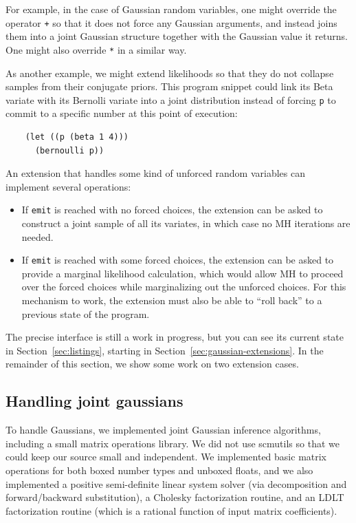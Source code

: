 \documentclass{article}
\begin{document}
For example, in the case of Gaussian random variables, one might override the
operator \texttt{+} so that it does not force any Gaussian arguments, and
instead joins them into a joint Gaussian structure together with the Gaussian
value it returns. One might also override \texttt{*} in a similar way.

As another example, we might extend likelihoods so that they do not collapse
samples from their conjugate priors. This program snippet could link its Beta variate
with its Bernolli variate into a joint distribution instead of forcing
\texttt{p} to commit to a specific number at this point of execution:

\begin{verbatim}
    (let ((p (beta 1 4)))
      (bernoulli p))
\end{verbatim}

An extension that handles some kind of unforced random variables can implement
several operations:
\begin{itemize}
    \item If \texttt{emit} is reached with no forced choices, the extension can
        be asked to construct a joint sample of all its variates, in which case
        no MH iterations are needed.
    \item If \texttt{emit} is reached with some forced choices, the extension
        can be asked to provide a marginal likelihood calculation, which would
        allow MH to proceed over the forced choices while marginalizing out the
        unforced choices. For this mechanism to work, the extension must also
        be able to ``roll back'' to a previous state of the program.
\end{itemize}

The precise interface is still a work in progress, but you can see its current
state in Section~\ref{sec:listings}, starting in
Section~\ref{sec:gaussian-extensions}. In the remainder of this section, we
show some work on two extension cases.

\subsection{Handling joint gaussians}
To handle Gaussians, we implemented joint Gaussian inference algorithms,
including a small matrix operations library. We did not use scmutils so that we
could keep our source small and independent. We implemented basic matrix
operations for both boxed number types and unboxed floats, and we also
implemented a positive semi-definite linear system solver (via decomposition
and forward/backward substitution), a Cholesky factorization routine, and an
LDLT factorization routine (which is a rational function of input matrix
coefficients).
\end{document}
